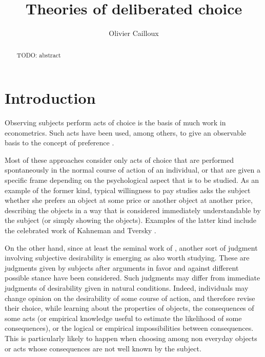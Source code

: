 \documentclass[version=last, pagesize, twoside=off, bibliography=totoc, DIV=calc, fontsize=12pt, a4paper, french, english]{scrartcl}
\begin{document}
\title{Theories of deliberated choice}
\author{Olivier Cailloux}
\makeatletter
\makeatother
\maketitle

\begin{abstract}
	TODO: abstract
\end{abstract}

\section{Introduction} 
Observing subjects perform acts of choice is the basis of much work in econometrics. Such acts have been used, among others, to give an observable basis to the concept of preference \citep{samuelson_foundations_1983}. %

Most of these approaches consider only acts of choice that are performed spontaneously in the normal course of action of an individual, or that are given a specific frame depending on the psychological aspect that is to be studied. As an example of the former kind, typical willingness to pay studies asks the subject whether she prefers an object at some price or another object at another price, describing the objects in a way that is considered immediately understandable by the subject (or simply showing the objects). Examples of the latter kind include the celebrated work of Kahneman and Tversky \citep{bell_descriptive_1988, kahneman_thinking_2012}.

On the other hand, since at least the seminal work of \citet{fishkin_when_2011}, another sort of judgment involving subjective desirability is emerging as also worth studying. These are judgments given by subjects after arguments in favor and against different possible stance have been considered. Such judgments may differ from immediate judgments of desirability given in natural conditions. Indeed, individuals may change opinion on the desirability of some course of action, and therefore revise their choice, while learning about the properties of objects, the consequences of some acts (or empirical knowledge useful to estimate the likelihood of some consequences), or the logical or empirical impossibilities between consequences. This is particularly likely to happen when choosing among non everyday objects or acts whose consequences are not well known by the subject. 
\end{document}
